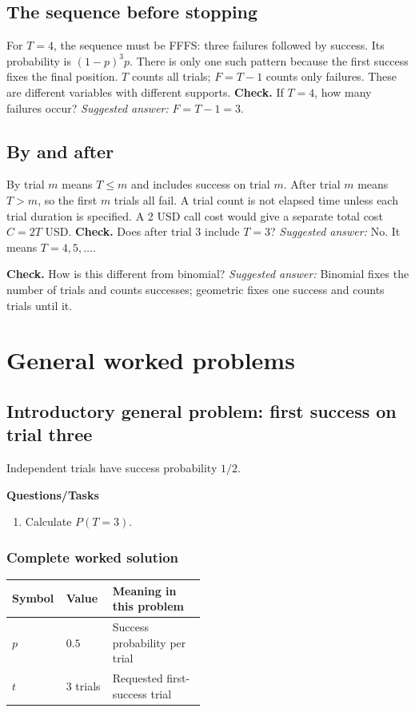 \subsection{The sequence before stopping}
For $T=4$, the sequence must be FFFS: three failures followed by success. Its probability is $(1-p)^3p$. There is only one such pattern because the first success fixes the final position. $T$ counts all trials; $F=T-1$ counts only failures. These are different variables with different supports.
\textbf{Check.} If $T=4$, how many failures occur? \emph{Suggested answer:} $F=T-1=3$.


\subsection{By and after}
By trial $m$ means $T\leq m$ and includes success on trial $m$. After trial $m$ means $T>m$, so the first $m$ trials all fail. A trial count is not elapsed time unless each trial duration is specified. A 2 USD call cost would give a separate total cost $C=2T$ USD.
\textbf{Check.} Does after trial 3 include $T=3$? \emph{Suggested answer:} No. It means $T=4,5,\ldots$.

\textbf{Check.} How is this different from binomial? \emph{Suggested answer:} Binomial fixes the number of trials and counts successes; geometric fixes one success and counts trials until it.

\section{General worked problems}
\subsection{Introductory general problem: first success on trial three}
Independent trials have success probability $1/2$.

\textbf{Questions/Tasks}
\begin{enumerate}
\item Calculate $P(T=3)$. 
\end{enumerate}
\subsubsection*{Complete worked solution}
\begin{center}
\begin{tabular}{llp{0.48\linewidth}}
\toprule
Symbol & Value & Meaning in this problem \\ \midrule
$p$ & $0.5$ & Success probability per trial \\
$t$ & $3$ trials & Requested first-success trial \\
\bottomrule
\end{tabular}
\end{center}


